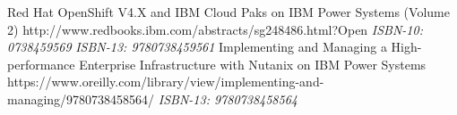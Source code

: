 %
%
%


\begin{publications}
    \publication
        {Red Hat OpenShift V4.X and IBM Cloud Paks on IBM Power Systems (Volume 2)}
        {http://www.redbooks.ibm.com/abstracts/sg248486.html?Open}
        \emph{ISBN-10: 0738459569}
        \newline
        \emph{ISBN-13: 9780738459561}
        \newline
    \publication
        {Implementing and Managing a High-performance Enterprise Infrastructure with Nutanix on IBM Power Systems}
        {https://www.oreilly.com/library/view/implementing-and-managing/9780738458564/}
        \emph{ISBN-13: 9780738458564}
        \newline
\end{publications}